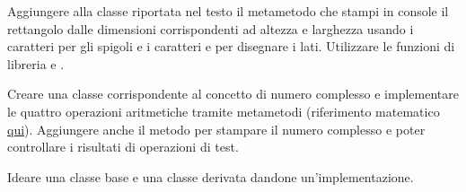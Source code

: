 \begin{Exercise}[label=oop-01]
Aggiungere alla classe  riportata nel testo il metametodo
 che stampi in console il rettangolo dalle dimensioni
corrispondenti ad altezza e larghezza usando i caratteri \key{+} per gli
spigoli e i caratteri \key{-} e \key{|} per disegnare i lati. Utilizzare le
funzioni di libreria  e .
\end{Exercise}

\begin{Exercise}[label=oop-02]
Creare una classe corrispondente al concetto di numero complesso e implementare
le quattro operazioni aritmetiche tramite metametodi (riferimento matematico
\href{http://it.wikipedia.org/wiki/Numero_complesso#Operazioni_con_i_numeri_complessi}{qui}).
Aggiungere anche il metodo  per stampare il numero complesso e
poter controllare i risultati di operazioni di test.
\end{Exercise}

\begin{Exercise}[label=oop-03]
Ideare una classe base e una classe derivata dandone un'implementazione.
\end{Exercise}

